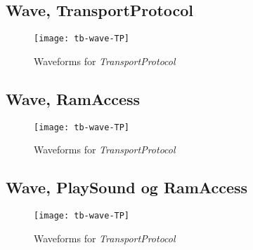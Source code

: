\documentclass[Aflevering]{subfiles}
\begin{document}
\subsection{Wave, TransportProtocol}
\label{app:wave-TP}
\begin{figure}[hbtp]
\centering
\texttt{[image: tb-wave-TP]}
\caption{Waveforms for \textit{TransportProtocol}}
\label{fig:TP}
\end{figure}


\subsection{Wave, RamAccess}
\label{app:wave-RA}
\begin{figure}[hbtp]
\centering
\texttt{[image: tb-wave-TP]}
\caption{Waveforms for \textit{TransportProtocol}}
\label{fig:TP}
\end{figure}

\subsection{Wave, PlaySound og RamAccess}
\label{app:wave-PS}
\begin{figure}[hbtp]
\centering
\texttt{[image: tb-wave-TP]}
\caption{Waveforms for \textit{TransportProtocol}}
\label{fig:TP}
\end{figure}
\end{document}
